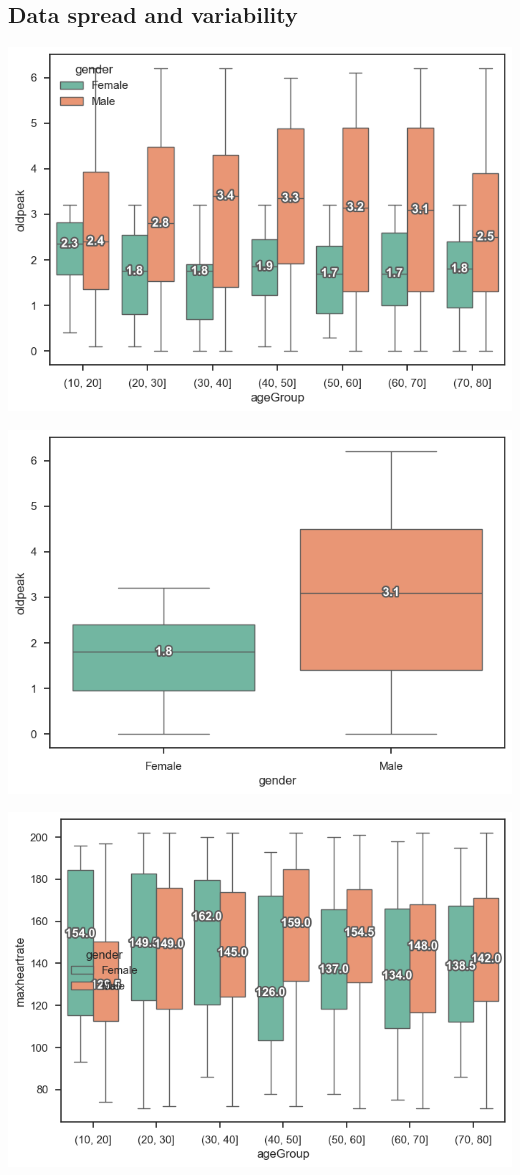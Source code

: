 \subsection{Data spread and variability}


\includegraphics[width=0.8\linewidth]{media/boxplot-01-agegroup-gender-oldpeak.png}

\includegraphics[width=0.8\linewidth]{media/boxplot-02-gender-oldpeak.png}

\includegraphics[width=0.8\linewidth]{media/boxplot-03-agegroup-gender-heartrate.png}

